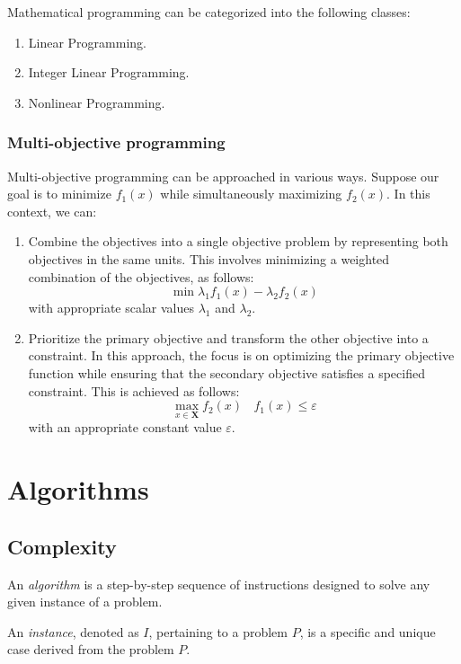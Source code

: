 \documentclass[12pt, a4paper]{report}
\begin{document}
    Mathematical programming can be categorized into the following classes:
    \begin{enumerate}
        \item Linear Programming.
        \item Integer Linear Programming.
        \item Nonlinear Programming. 
    \end{enumerate}
    
    \subsection{Multi-objective programming}
    Multi-objective programming can be approached in various ways. 
    Suppose our goal is to minimize $f_1(x)$ while simultaneously maximizing $f_2(x)$. 
    In this context, we can:
    \begin{enumerate}
        \item Combine the objectives into a single objective problem by representing both objectives in the same units. 
            This involves minimizing a weighted combination of the objectives, as follows:
            \[\min{\lambda_1f_1(x)-\lambda_2f_2(x)}\]
            with appropriate scalar values $\lambda_1$ and $\lambda_2$.
        \item Prioritize the primary objective and transform the other objective into a constraint. 
            In this approach, the focus is on optimizing the primary objective function while ensuring that the secondary objective satisfies a specified constraint. 
            This is achieved as follows:
            \[\max_{x \in \boldsymbol{X}}f_2(x) \:\:\:\: f_1(x)\leq \varepsilon\]
            with an appropriate constant value $\varepsilon$. 
    \end{enumerate}

\newpage

\chapter{Algorithms}
    \section{Complexity}
    \begin{definition}
        An \emph{algorithm} is a step-by-step sequence of instructions designed to solve any given instance of a problem.

        An \emph{instance}, denoted as $I$, pertaining to a problem $P$, is a specific and unique case derived from the problem $P$.
    \end{definition}
\end{document}
